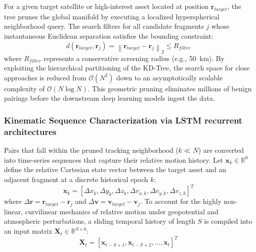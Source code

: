 \documentclass[letterpaper, preprint, 11pt]{AAS}
\begin{document}
For a given target satellite or high-interest asset located at position $\mathbf{r}_{target}$, the tree prunes the global manifold by executing a localized hyperspherical neighborhood query. The search filters for all candidate fragments $j$ whose instantaneous Euclidean separation satisfies the bounding constraint:
\begin{equation}
    d(\mathbf{r}_{target}, \mathbf{r}_j) = \left\| \mathbf{r}_{target} - \mathbf{r}_j \right\|_2 \le R_{filter}
    \label{eq:kdtree_distance}
\end{equation}
where $R_{filter}$ represents a conservative screening radius (e.g., 50~km). By exploiting the hierarchical partitioning of the KD-Tree, the search space for close approaches is reduced from $\mathcal{O}(N^2)$ down to an asymptotically scalable complexity of $\mathcal{O}(N \log N)$. This geometric pruning eliminates millions of benign pairings before the downstream deep learning models ingest the data.

\subsubsection{Kinematic Sequence Characterization via LSTM recurrent architectures}
Pairs that fall within the pruned tracking neighborhood ($k \ll N$) are converted into time-series sequences that capture their relative motion history. Let $\mathbf{x}_k \in \mathbb{R}^6$ define the relative Cartesian state vector between the target asset and an adjacent fragment at a discrete historical epoch $k$:
\begin{equation}
    \mathbf{x}_k = \left[ \Delta x_k, \Delta y_k, \Delta z_k, \Delta v_{x,k}, \Delta v_{y,k}, \Delta v_{z,k} \right]^T
    \label{eq:relative_state_vector}
\end{equation}
where $\Delta \mathbf{r} = \mathbf{r}_{target} - \mathbf{r}_j$ and $\Delta \mathbf{v} = \mathbf{v}_{target} - \mathbf{v}_j$. To account for the highly non-linear, curvilinear mechanics of relative motion under geopotential and atmospheric perturbations, a sliding temporal history of length $S$ is compiled into an input matrix $\mathbf{X}_t \in \mathbb{R}^{S \times 6}$:
\begin{equation}
    \mathbf{X}_t = \left[ \mathbf{x}_{t-S+1}, \mathbf{x}_{t-S+2}, \dots, \mathbf{x}_t \right]^T
    \label{eq:sequence_matrix}
\end{equation}
\end{document}
